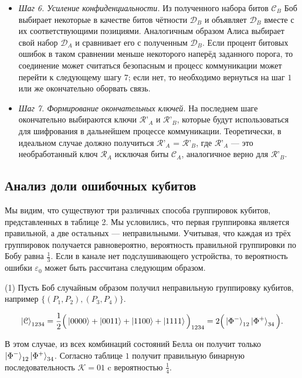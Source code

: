 \documentclass[a4paper,11pt]{article}
\begin{document}
\begin{itemize}
\item \textit{Шаг 6. Усиление конфиденциальности.} Из полученного набора битов $\mathcal{C}_B$ Боб выбирает некоторые в качестве битов чётности $\mathcal{D}_B$ и объявляет $\mathcal{D}_B$ вместе с их соответствующими позициями. Аналогичным образом Алиса выбирает свой набор $\mathcal{D}_A$ и сравнивает его с полученным $\mathcal{D}_B$. Если процент битовых ошибок в таком сравнении меньше некоторого наперёд заданного порога, то соединение может считаться безопасным и процесс коммуникации может перейти к следующему шагу $7$; если нет, то необходимо вернуться на шаг $1$ или же окончательно оборвать связь.

\item \textit{Шаг 7. Формирование окончательных ключей.} На последнем шаге окончательно выбираются ключи $\mathcal{R}’_A$ и $\mathcal{R}’_B$, которые будут использоваться для шифрования в дальнейшем процессе коммуникации. Теоретически, в идеальном случае должно получиться $\mathcal{R}’_A$ = $\mathcal{R}’_B$, где $\mathcal{R}’_A$ --- это необработанный ключ $\mathcal{R}_A$ исключая биты $\mathcal{C}_A$, аналогичное верно для $\mathcal{R}’_B$.
\end{itemize}

\subsection{Анализ доли ошибочных кубитов}

Мы видим, что существуют три различных способа группировок кубитов, представленных в таблице 2. Мы условились, что первая группировка является правильной, а две остальных --- неправильными. Учитывая, что каждая из трёх группировок получается равновероятно, вероятность правильной группировки по Бобу равна $\frac{1}{3}$. Если в канале нет подслушивающего устройства, то вероятность ошибки $\varepsilon_0$ может быть рассчитана следующим образом.

(1) Пусть Боб случайным образом получил неправильную группировку кубитов, например $\{(P_1 , P_2), (P_3 , P_4)\}$.

\begin{equation*}
\ket{\mathcal{C}}_{1234} = \dfrac{1}{2} \Big(\ket{0000} + \ket{0011}
 + \ket{1100} + \ket{1111} \Big)_{1234} = 2 \Big(\ket{\Phi^-}_{12} \ket{\Phi^+}_{34}\Big).
\end{equation*}

В этом случае, из всех комбинаций состояний Белла он получит только $\ket{\Phi^-}_{12} \ket{\Phi^+}_{34}$. Согласно таблице $1$ получит правильную бинарную последовательность $\mathcal{K} = 01$ c вероятностью $\frac{1}{4}$.
\end{document}
